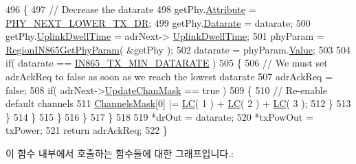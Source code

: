 \begin{DoxyCode}
496                 \{
497                     \textcolor{comment}{// Decrease the datarate}
498                     getPhy.\mbox{\hyperlink{structs_get_phy_params_abdcb168ffd6913b85e2f635d7a475f2d}{Attribute}} = \mbox{\hyperlink{group___r_e_g_i_o_n_gga51cbe8f5433d914fe9cf81b451de2c2dac002e7e492cf30dbf9c544b062f5cc8a}{PHY\_NEXT\_LOWER\_TX\_DR}};
499                     getPhy.\mbox{\hyperlink{structs_get_phy_params_ae2f6080f3aa0e9485c55513ca56bb24d}{Datarate}} = datarate;
500                     getPhy.\mbox{\hyperlink{structs_get_phy_params_a0e6663762d6f9173bc8d8cb018f8f17a}{UplinkDwellTime}} = adrNext->
      \mbox{\hyperlink{structs_adr_next_params_a0e6663762d6f9173bc8d8cb018f8f17a}{UplinkDwellTime}};
501                     phyParam = \mbox{\hyperlink{group___r_e_g_i_o_n_i_n865_ga209a89a7195dbbee8428bbcd0133d986}{RegionIN865GetPhyParam}}( &getPhy );
502                     datarate = phyParam.\mbox{\hyperlink{unionu_phy_param_a8e0dcce3428a8051614e852b8836d0d1}{Value}};
503 
504                     \textcolor{keywordflow}{if}( datarate == \mbox{\hyperlink{group___r_e_g_i_o_n_i_n865_ga334bf7f8b226ad91762f977490af0c72}{IN865\_TX\_MIN\_DATARATE}} )
505                     \{
506                         \textcolor{comment}{// We must set adrAckReq to false as soon as we reach the lowest datarate}
507                         adrAckReq = \textcolor{keyword}{false};
508                         \textcolor{keywordflow}{if}( adrNext->\mbox{\hyperlink{structs_adr_next_params_a708080da9c63d868556b2c48cb53003b}{UpdateChanMask}} == \textcolor{keyword}{true} )
509                         \{
510                             \textcolor{comment}{// Re-enable default channels}
511                             \mbox{\hyperlink{_region_i_n865_8c_a2188957b5ca6af8092154d7ccbfa5757}{ChannelsMask}}[0] |= \mbox{\hyperlink{group___r_e_g_i_o_n_ga12fa17e5c1016e01a9d82c25027deb1b}{LC}}( 1 ) + \mbox{\hyperlink{group___r_e_g_i_o_n_ga12fa17e5c1016e01a9d82c25027deb1b}{LC}}( 2 ) + 
      \mbox{\hyperlink{group___r_e_g_i_o_n_ga12fa17e5c1016e01a9d82c25027deb1b}{LC}}( 3 );
512                         \}
513                     \}
514                 \}
515             \}
516         \}
517     \}
518 
519     *drOut = datarate;
520     *txPowOut = txPower;
521     \textcolor{keywordflow}{return} adrAckReq;
522 \}
\end{DoxyCode}
이 함수 내부에서 호출하는 함수들에 대한 그래프입니다.\+:
\mbox{\label{group___r_e_g_i_o_n_i_n865_ga72329572c10b8a2ad861af70bccff193}} 
